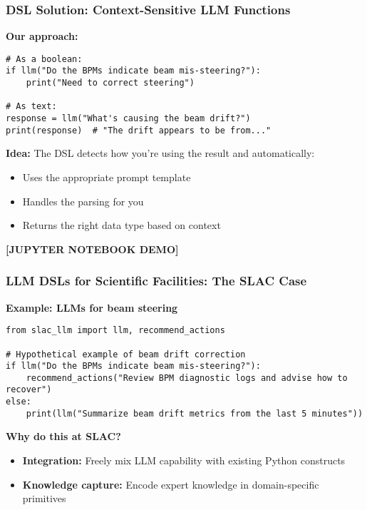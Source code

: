 \documentclass{beamer}
\begin{document}
\begin{frame}[fragile]
\frametitle{DSL Solution: Context-Sensitive LLM Functions}

\textbf{Our approach:}
\begin{lstlisting}[basicstyle=\ttfamily\footnotesize]
# As a boolean:
if llm("Do the BPMs indicate beam mis-steering?"):
    print("Need to correct steering")

# As text:
response = llm("What's causing the beam drift?")
print(response)  # "The drift appears to be from..."
\end{lstlisting}

\textbf{Idea:} The DSL detects how you're using the result and automatically:
\begin{itemize}
\item Uses the appropriate prompt template
\item Handles the parsing for you
\item Returns the right data type based on context
\end{itemize}
\end{frame}

\begin{frame}
\begin{center}
\vspace{1cm}
\textbf{[JUPYTER NOTEBOOK DEMO]}
\end{center}
\end{frame}

\begin{frame}[fragile]
\frametitle{LLM DSLs for Scientific Facilities: The SLAC Case}

\textbf{Example: LLMs for beam steering}
\begin{lstlisting}[basicstyle=\ttfamily\footnotesize]
from slac_llm import llm, recommend_actions

# Hypothetical example of beam drift correction
if llm("Do the BPMs indicate beam mis-steering?"):
    recommend_actions("Review BPM diagnostic logs and advise how to recover")
else:
    print(llm("Summarize beam drift metrics from the last 5 minutes"))
\end{lstlisting}

\vspace{0.3cm}
\textbf{Why do this at SLAC?}
\begin{itemize}
\item \textbf{Integration:} Freely mix LLM capability with existing Python constructs
\item \textbf{Knowledge capture:} Encode expert knowledge in domain-specific primitives
\end{itemize}

\centering
\end{frame}
\end{document}
